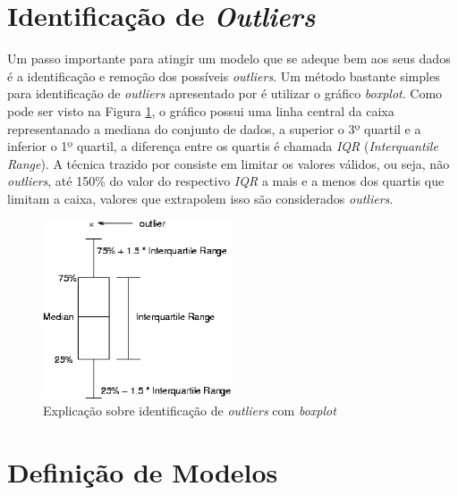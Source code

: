 \section{Identificação de \textit{Outliers}}

Um passo importante para atingir um modelo que se adeque bem aos seus dados é a
identificação e remoção dos possíveis \textit{outliers}. Um método bastante
simples para identificação de \textit{outliers} apresentado por
 é utilizar o gráfico \textit{boxplot}. Como pode ser
visto na Figura \ref{fig:boxplot}, o gráfico possui uma linha central da caixa
representanado a mediana do conjunto de dados, a superior o 3º quartil e a inferior
o 1º quartil, a diferença entre os quartis é chamada \textit{IQR}
(\textit{Interquantile Range}). A técnica trazido por 
consiste em limitar os valores válidos, ou seja, não \textit{outliers}, até
150\% do valor do respectivo \textit{IQR} a mais e a menos dos quartis que
limitam a caixa, valores que extrapolem isso são considerados \textit{outliers}.

\begin{figure}[h]
  \centering
  \includegraphics[width=0.5\textwidth]
      {figuras/boxplot}
      \caption{Explicação sobre identificação de \textit{outliers} com
      \textit{boxplot}}
  \label{fig:boxplot}
\end{figure}

\section{Definição de Modelos}

